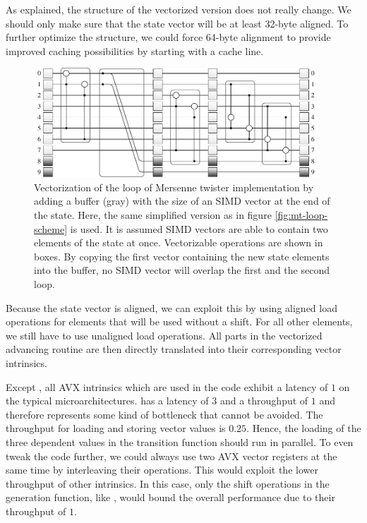 \documentclass{stdlocal}
\begin{document}
    As explained, the structure of the vectorized version does not really change.
    We should only make sure that the state vector will be at least 32-byte aligned.
    To further optimize the structure, we could force 64-byte alignment to provide improved caching possibilities by starting with a cache line.


    \begin{figure}
      \center
      \includegraphics[width=0.95\textwidth]{figures/mt19937_vector_loop_scheme.pdf}
      \caption[Mersenne Twister Vector Loop Scheme]{
        Vectorization of the loop of Mersenne twister implementation by adding a buffer (gray) with the size of an SIMD vector at the end of the state.
        Here, the same simplified version as in figure \ref{fig:mt-loop-scheme} is used.
        It is assumed SIMD vectors are able to contain two elements of the state at once.
        Vectorizable operations are shown in boxes.
        By copying the first vector containing the new state elements into the buffer, no SIMD vector will overlap the first and the second loop.
      }
      \label{fig:mt-vector-loop-scheme}
    \end{figure}

    Because the state vector is aligned, we can exploit this by using aligned load operations for elements that will be used without a shift.
    For all other elements, we still have to use unaligned load operations.
    All parts in the vectorized advancing routine are then directly translated into their corresponding vector intrinsics.

    Except , all AVX intrinsics which are used in the code exhibit a latency of $1$ on the typical microarchitectures.
     has a latency of $3$ and a throughput of $1$ and therefore represents some kind of bottleneck that cannot be avoided.
    The throughput for loading and storing vector values is $0.25$.
    Hence, the loading of the three dependent values in the transition function should run in parallel.
    To even tweak the code further, we could always use two AVX vector registers at the same time by interleaving their operations.
    This would exploit the lower throughput of other intrinsics.
    In this case, only the shift operations in the generation function, like , would bound the overall performance due to their throughput of $1$.
    \autocite{intel-intrinsics-guide,fog2019d}
\end{document}

